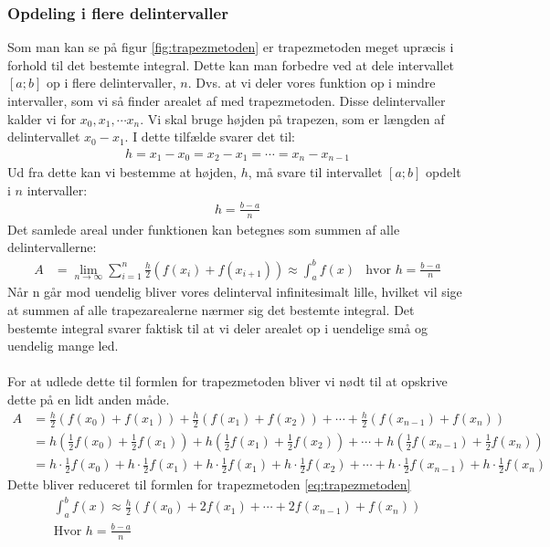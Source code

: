 \documentclass[12pt]{article}
\numberwithin{equation}{section}
\begin{document}
\subsubsection{Opdeling i flere delintervaller}
\label{sec:opdelingtrapezmetoden}
Som man kan se på figur \ref{fig:trapezmetoden} er trapezmetoden meget upræcis i forhold til det bestemte integral. Dette kan man forbedre ved at dele intervallet $[a;b]$ op i flere delintervaller, $n$. Dvs. at vi deler vores funktion op i mindre intervaller, som vi så finder arealet af med trapezmetoden. Disse delintervaller kalder vi for $x_0, x_1, \cdots x_n$. Vi skal bruge højden på trapezen, som er længden af delintervallet $x_0 - x_1$. I dette tilfælde svarer det til:
\begin{align}
h = x_1-x_0 = x_2-x_1 = \cdots = x_n - x_{n-1}
\end{align}
Ud fra dette kan vi bestemme at højden, $h$, må svare til intervallet $[a;b]$ opdelt i $n$ intervaller:
\begin{align}
h=\frac{b-a}{n}
\end{align}
Det samlede areal under funktionen kan betegnes som summen af alle delintervallerne:
\begin{align}
A &= \lim\limits_{n \rightarrow \infty} \sum_{i=1}^{n} \frac{h}{2}(f(x_{i}) + f(x_{i+1}))
\approx \int_{a}^{b}f(x) &\text{hvor }h=\frac{b-a}{n}
\end{align}
Når n går mod uendelig bliver vores delinterval infinitesimalt lille, hvilket vil sige at summen af alle trapezarealerne nærmer sig det bestemte integral. Det bestemte integral svarer faktisk til at vi deler arealet op i uendelige små og uendelig mange led.
\\\\
For at udlede dette til formlen for trapezmetoden bliver vi nødt til at opskrive dette på en lidt anden måde.
\begin{align}
A &= \frac{h}{2}(f(x_0)+ f(x_1)) + \frac{h}{2}(f(x_1)+ f(x_2)) + \cdots + \frac{h}{2}(f(x_{n-1})+ f(x_n)) \nonumber
\\ &= h(\frac{1}{2}f(x_0) + \frac{1}{2}f(x_1)) + h(\frac{1}{2}f(x_1) + \frac{1}{2}f(x_2)) + \cdots + h(\frac{1}{2}f(x_{n-1}) + \frac{1}{2}f(x_n)) \nonumber
\\ &= h \cdot \frac{1}{2}f(x_0) + h \cdot \frac{1}{2}f(x_1) + h \cdot \frac{1}{2}f(x_1) + h \cdot \frac{1}{2}f(x_2) + \cdots + h \cdot \frac{1}{2}f(x_{n-1}) + h \cdot \frac{1}{2}f(x_n) \nonumber
\end{align}
Dette bliver reduceret til formlen for trapezmetoden \eqref{eq:trapezmetoden}
\begin{align}
\label{eq:trapezmetoden}
\boxed{\int_{a}^{b}f(x) \approx \frac{h}{2}(f(x_0) + 2f(x_1) + \cdots + 2f(x_{n-1}) + f(x_n))} \\ \text{Hvor } h=\frac{b-a}{n} \nonumber
\end{align}
\end{document}
